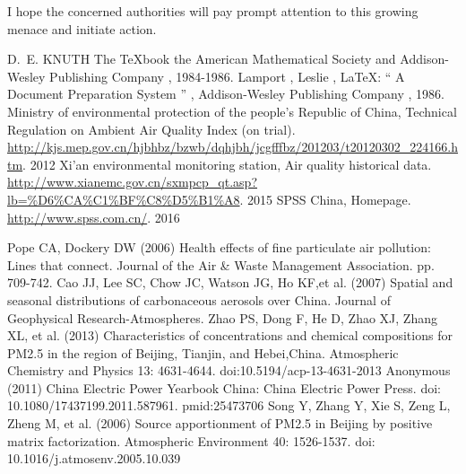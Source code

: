\documentclass[a4paper,11pt]{article}
\begin{document}
\par I hope the concerned authorities will pay prompt attention to this growing menace and initiate action.
\par 
{}



\begin{thebibliography}{}
%
%
 D.~E. KNUTH   The \TeX{}book  the American
Mathematical Society and Addison-Wesley
Publishing Company  ,  1984-1986.
Lamport ,  Leslie ,   \LaTeX{}: `` A Document Preparation System '' , 
Addison-Wesley Publishing Company ,  1986.
Ministry of environmental protection of the people's Republic of China, Technical Regulation on Ambient Air Quality Index (on trial). \url{http://kjs.mep.gov.cn/hjbhbz/bzwb/dqhjbh/jcgfffbz/201203/t20120302_224166.htm}. 2012
Xi'an environmental monitoring station, Air quality historical data. \url{http://www.xianemc.gov.cn/sxmpcp_qt.asp?lb=%D6%CA%C1%BF%C8%D5%B1%A8}. 2015
SPSS China, Homepage. \url{http://www.spss.com.cn/}. 2016

Pope CA, Dockery DW (2006) Health effects of fine particulate air pollution: Lines that connect. Journal of the Air \& Waste Management Association. pp. 709-742.
Cao JJ, Lee SC, Chow JC, Watson JG, Ho KF,et al. (2007) Spatial and seasonal distributions of carbonaceous aerosols over China. Journal of Geophysical Research-Atmospheres.
Zhao PS, Dong F, He D, Zhao XJ, Zhang XL, et al. (2013) Characteristics of concentrations and chemical compositions for PM2.5 in the region of Beijing, Tianjin, and Hebei,China. Atmospheric Chemistry and Physics 13: 4631-4644. doi:10.5194/acp-13-4631-2013
Anonymous (2011) China Electric Power Yearbook China: China Electric Power Press. doi: 10.1080/17437199.2011.587961. pmid:25473706
Song Y, Zhang Y, Xie S, Zeng L, Zheng M, et al. (2006) Source apportionment of PM2.5 in Beijing by positive matrix factorization. Atmospheric Environment 40: 1526-1537. doi: 10.1016/j.atmosenv.2005.10.039


\end{thebibliography}
\end{document}

